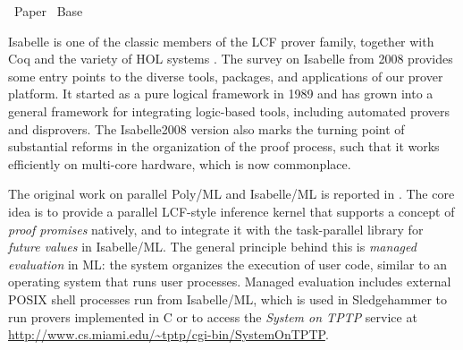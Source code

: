 %
\begin{isabellebody}%
\def\isabellecontext{Paper}%
%
\isadelimtheory
%
\endisadelimtheory
%
\isatagtheory
{}\isamarkupfalse%
\ Paper\isanewline
{}\ Base\isanewline
{}%
\endisatagtheory
{\isafoldtheory}%
%
\isadelimtheory
%
\endisadelimtheory
%
\isamarkuptrue%
%
\isamarkuptrue%
%
\begin{isamarkuptext}%
Isabelle \cite[\S6]{Wiedijk:2006} is one of the classic
  members of the LCF prover family, together with Coq
  \cite[\S4]{Wiedijk:2006} and the variety of HOL systems
  \cite[\S1]{Wiedijk:2006}.  The survey on Isabelle
  \cite{Wenzel-Paulson-Nipkow:2008} from 2008 provides some entry
  points to the diverse tools, packages, and applications of our
  prover platform.  It started as a pure logical framework in 1989 and
  has grown into a general framework for integrating logic-based
  tools, including automated provers and disprovers.  The
  Isabelle2008 version also marks the turning point of substantial
  reforms in the organization of the proof process, such that it works
  efficiently on multi-core hardware, which is now commonplace.

  The original work on parallel Poly/ML and Isabelle/ML is reported in
  \cite{Matthews-Wenzel:2010,Wenzel:2009,Wenzel:2013:ITP}.  The core
  idea is to provide a parallel LCF-style inference kernel that
  supports a concept of \emph{proof promises} natively, and to
  integrate it with the task-parallel library for \emph{future values}
  in Isabelle/ML.  The general principle behind this is \emph{managed
  evaluation} in ML: the system organizes the execution of user code,
  similar to an operating system that runs user processes.  Managed
  evaluation includes external POSIX shell processes run from
  Isabelle/ML, which is used in Sledgehammer to run provers
  implemented in C or to access the \emph{System on TPTP} service at
  \url{http://www.cs.miami.edu/~tptp/cgi-bin/SystemOnTPTP}.


\end{isamarkuptext}
\end{isabellebody}
